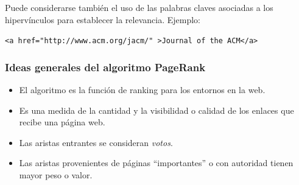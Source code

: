 \documentclass[
10pt, %
aspectratio=169, %
]{beamer}
\begin{document}
\begin{frame}
{			\vspace{1\baselineskip}
			Puede considerarse también el uso de las palabras claves asociadas a los hipervínculos para establecer la relevancia. Ejemplo:
			
			\centering
			\texttt{<a href="http://www.acm.org/jacm/" >Journal of the ACM</a>}
			
		}
		
	\end{frame}
	
	\begin{frame}
		
		\frametitle{Ideas generales del algoritmo PageRank}
		
		\begin{itemize}
			
			\item El algoritmo es la función de ranking para los entornos en la web. \\[2mm]
			
			\item Es una medida de la cantidad y la visibilidad o calidad de los enlaces que recibe una página web.  \\[2mm]
			
			\item Las aristas entrantes se consideran \emph{votos}. \\[2mm]
			
			\item Las aristas provenientes de páginas ``importantes'' o con autoridad tienen mayor peso o valor.
			
		\end{itemize}
		
	\end{frame}
	
\end{document}
